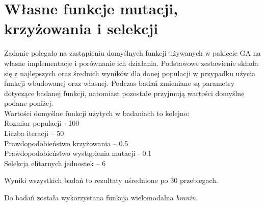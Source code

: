 \section{Własne funkcje mutacji, krzyżowania i selekcji}

Zadanie polegało na zastąpieniu domyślnych funkcji używanych w pakiecie GA na własne implementacje i porównanie ich działania. Podstawowe zestawienie składa się z najlepszych oraz średnich wyników dla danej populacji w przypadku użycia funkcji wbudowanej oraz własnej. Podczas badań zmieniane są parametry dotyczące badanej funkcji, natomiast pozostałe przyjmują wartości domyślne podane poniżej.\\

Wartości domyślne funkcji użytych w badaniach to kolejno:\\
Rozmiar populacji - 100\\
Liczba iteracji – 50\\
Prawdopodobieństwo krzyżowania – 0.5\\
Prawdopodobieństwo wystąpienia mutacji - 0.1\\
Selekcja elitarnych jednostek – 6\\
\newline

Wyniki wszystkich badań to rezultaty uśrednione po 30 przebiegach.\\
\newline

Do badań została wykorzystana funkcja wielomodalna \textit{branin}.

